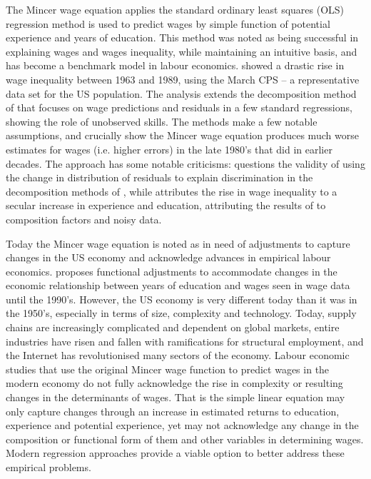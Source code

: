 \documentclass[notitlepage,12pt]{article}
\newcommand{\1}[1]{\ensuremath{\mathbb{1}\left( #1 \right)}}               %
\begin{document}
The Mincer wage equation applies the standard ordinary least squares (OLS) regression method is used to predict wages by simple function of potential experience and years of education.  This method was noted as being successful in explaining wages and wages inequality, while maintaining an intuitive basis, and has become a benchmark model in labour economics.  \cite{juhn1993wage} showed a drastic rise in wage inequality between 1963 and 1989, using the March CPS -- a representative data set for the US population.  The analysis extends the decomposition method of \cite{jmp2011} that focuses on wage predictions and residuals in a few standard regressions, showing the role of unobserved skills.  The methods make a few notable assumptions, and crucially show the Mincer wage equation produces much worse estimates for wages (i.e. higher errors) in the late 1980's that did in earlier decades.  The approach has some notable criticisms: \cite{yun2009wage} questions the validity of using the change in distribution of residuals to explain discrimination in the decomposition methods of \cite{jmp2011,juhn1993wage}, while \cite{lemieux2006increasing} attributes the rise in wage inequality to a secular increase in experience and education, attributing the results of \cite{juhn1993wage} to composition factors and noisy data.

Today the Mincer wage equation is noted as in need of adjustments to capture changes in the US economy and acknowledge advances in empirical labour economics.  \cite{lemieux2006mincer} proposes functional adjustments to accommodate changes in the economic relationship between years of education and wages seen in wage data until the 1990's.  However, the US economy is very different today than it was in the 1950's, especially in terms of size, complexity and technology.  Today, supply chains are increasingly complicated and dependent on global markets, entire industries have risen and fallen with ramifications for structural employment, and the Internet has revolutionised many sectors of the economy.  Labour economic studies that use the original Mincer wage function to predict wages in the modern economy do not fully acknowledge the rise in complexity or resulting changes in the determinants of wages.  That is the simple linear equation may only capture changes through an increase in estimated returns to education, experience and potential experience, yet may not acknowledge any change in the composition or functional form of them and other variables in determining wages.  Modern regression approaches provide a viable option to better address these empirical problems.
\end{document}
